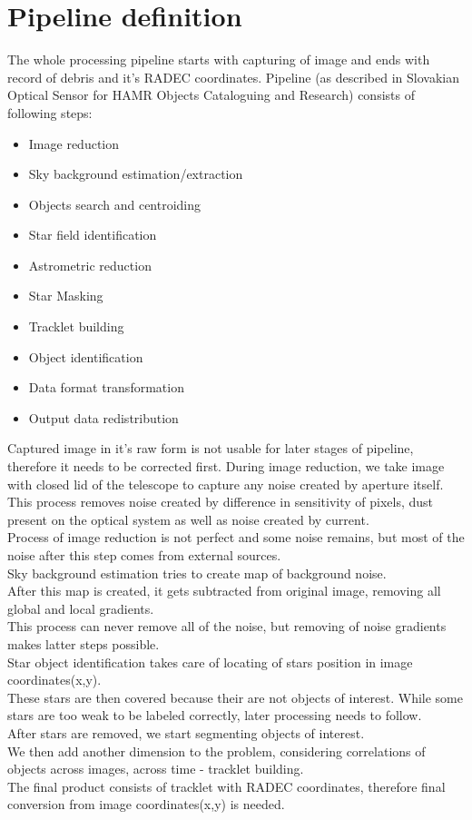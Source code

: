 \documentclass[12pt, a4paper, oneside]{book}
\begin{document}
\section{Pipeline definition}

The whole processing pipeline starts with capturing of image and ends with record of debris and it's RADEC coordinates.
Pipeline (as described in Slovakian Optical Sensor for HAMR Objects Cataloguing and Research) consists of following steps:
\clearpage
\begin{itemize}
    \item{Image reduction}
    \item{Sky background estimation/extraction}
    \item{Objects search and centroiding}
    \item{Star field identification}
    \item{Astrometric reduction}
    \item{Star Masking}
    \item{Tracklet building}
    \item{Object identification}
    \item{Data format transformation}
    \item{Output data redistribution}
\end{itemize}
\par
\indent
Captured image in it's raw form is not usable for later stages of pipeline, therefore it needs to be corrected first.
During image reduction, we take image with closed lid of the telescope to capture any noise created by aperture itself.
This process removes noise created by difference in sensitivity of pixels, dust present on the optical system as well as noise created by current.\\
\indent
Process of image reduction is not perfect and some noise remains, but most of the noise after this step comes from external sources.\\
\indent
Sky background estimation tries to create map of background noise.\\
After this map is created, it gets subtracted from original image, removing all global and local gradients.\\
This process can never remove all of the noise, but removing of noise gradients makes latter steps possible.\\
\indent
Star object identification takes care of locating of stars position in image coordinates(x,y).\\
These stars are then covered because their are not objects of interest.
While some stars are too weak to be labeled correctly, later processing needs to follow.\\
\indent
After stars are removed, we start segmenting objects of interest.\\
We then add another dimension to the problem, considering correlations of objects across images, across time - tracklet building.\\
\indent
The final product consists of tracklet with RADEC coordinates, therefore final conversion from image coordinates(x,y) is needed.\\
\end{document}
